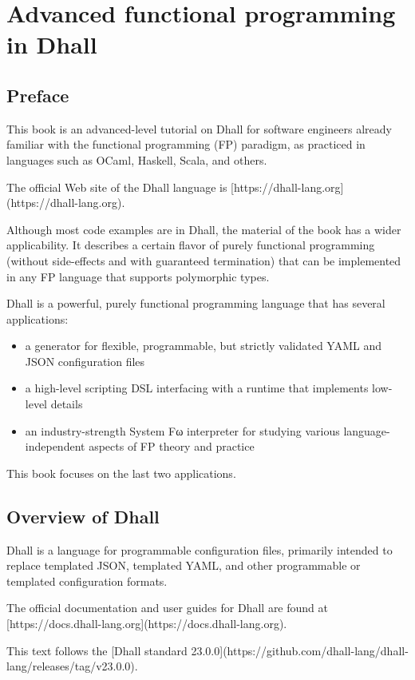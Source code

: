 \chapter{Advanced functional programming in Dhall}


\section{Preface}


This book is an advanced-level tutorial on Dhall for software engineers already familiar with the functional programming (FP) paradigm,
as practiced in languages such as OCaml, Haskell, Scala, and others.


The official Web site of the Dhall language is [https://dhall-lang.org](https://dhall-lang.org).


Although most code examples are in Dhall, the material of the book has a wider applicability.
It describes a certain flavor of purely functional programming (without side-effects and with guaranteed termination) that can be implemented in any FP language that supports polymorphic types.


Dhall is a powerful, purely functional programming language that has several applications:
\begin{itemize}
\item{a generator for flexible, programmable, but strictly validated YAML and JSON configuration files}
\item{a high-level scripting DSL interfacing with a runtime that implements low-level details }
\item{an industry-strength System Fω interpreter for studying various language-independent aspects of FP theory and practice}
\end{itemize}
This book focuses on the last two applications.


\section{Overview of Dhall}


Dhall is a language for programmable configuration files, primarily intended to replace templated JSON, templated YAML, and other programmable or templated configuration formats.


The official documentation and user guides for Dhall are found at [https://docs.dhall-lang.org](https://docs.dhall-lang.org).


This text follows the [Dhall standard 23.0.0](https://github.com/dhall-lang/dhall-lang/releases/tag/v23.0.0).


